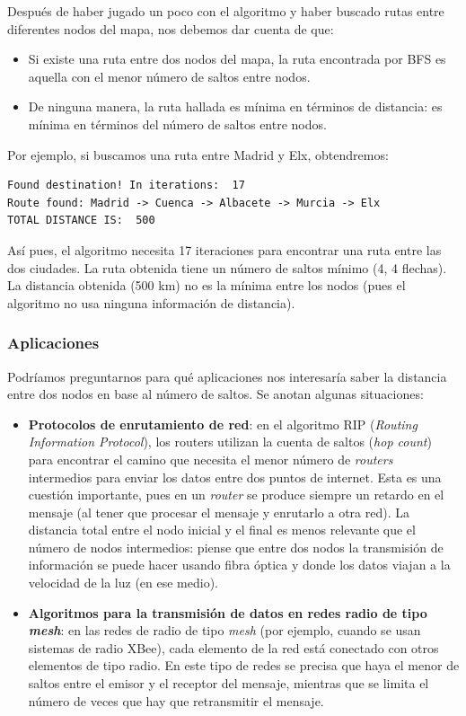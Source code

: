 \documentclass{article}
\begin{document}
Después de haber jugado un poco con el algoritmo y haber buscado rutas entre diferentes nodos del mapa, nos debemos dar cuenta de que:
\begin{itemize}
    \item Si existe una ruta entre dos nodos del mapa, la ruta encontrada por BFS es aquella con el menor número de saltos entre nodos.
    \item De ninguna manera, la ruta hallada es mínima en términos de distancia: es mínima en términos del número de saltos entre nodos.
\end{itemize}

Por ejemplo, si buscamos una ruta entre Madrid y Elx, obtendremos:
\begin{verbatim}
Found destination! In iterations:  17
Route found: Madrid -> Cuenca -> Albacete -> Murcia -> Elx
TOTAL DISTANCE IS:  500
    \end{verbatim}
Así pues, el algoritmo necesita 17 iteraciones para encontrar una ruta entre las dos ciudades. La ruta obtenida tiene un número de saltos mínimo (4, 4 flechas). La distancia obtenida (500 km) no es la mínima entre los nodos (pues el algoritmo no usa ninguna información de distancia).

\subsubsection{Aplicaciones}
Podríamos preguntarnos para qué aplicaciones nos interesaría saber la distancia entre dos nodos en base al número de saltos. Se anotan algunas situaciones:
\begin{itemize}
    \item \textbf{Protocolos de enrutamiento de red}: en el algoritmo RIP (\textit{Routing Information Protocol}), los routers utilizan la cuenta de saltos (\textit{hop count}) para encontrar el camino que necesita el menor número de \textit{routers} intermedios para enviar los datos entre dos puntos de internet. Esta es una cuestión importante, pues en un \textit{router} se produce siempre un retardo en el mensaje (al tener que procesar el mensaje y enrutarlo a otra red). La distancia total entre el nodo inicial y el final es menos relevante que el número de nodos intermedios: piense que entre dos nodos la transmisión de información se puede hacer usando fibra óptica y donde los datos viajan a la velocidad de la luz (en ese medio).
\item \textbf{Algoritmos para la transmisión de datos en redes radio de tipo \textit{mesh}}: en las redes de radio de tipo \textit{mesh} (por ejemplo, cuando se usan sistemas de radio XBee), cada elemento de la red está conectado con otros elementos de tipo radio. En este tipo de redes se precisa que haya el menor de saltos entre el emisor y el receptor del mensaje, mientras que se limita el número de veces que hay que retransmitir el mensaje.
\end{itemize}
\end{document}
